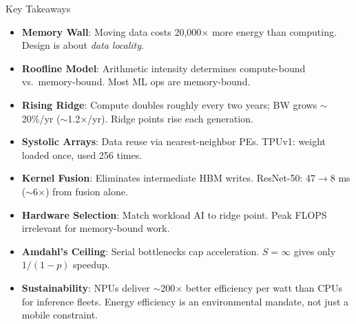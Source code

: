 \documentclass[aspectratio=169, 12pt]{beamer}
\begin{document}
\begin{frame}{Key Takeaways}

\scriptsize
\begin{itemize}\setlength\itemsep{0pt}
  \item \textbf{Memory Wall}: Moving data costs 20,000$\times$ more energy than computing. Design is about \emph{data locality}.
  \item \textbf{Roofline Model}: Arithmetic intensity determines compute-bound vs.\ memory-bound. Most ML ops are memory-bound.
  \item \textbf{Rising Ridge}: Compute doubles roughly every two years; BW grows $\sim$20\%/yr ($\sim$1.2$\times$/yr). Ridge points rise each generation.
  \item \textbf{Systolic Arrays}: Data reuse via nearest-neighbor PEs. TPUv1: weight loaded once, used 256 times.
  \item \textbf{Kernel Fusion}: Eliminates intermediate HBM writes. ResNet-50: 47$\to$8 ms ($\sim$6$\times$) from fusion alone.
  \item \textbf{Hardware Selection}: Match workload AI to ridge point. Peak FLOPS irrelevant for memory-bound work.
  \item \textbf{Amdahl's Ceiling}: Serial bottlenecks cap acceleration. $S\!=\!\infty$ gives only $1/(1\!-\!p)$ speedup.
  \item \textbf{Sustainability}: NPUs deliver $\sim$200$\times$ better efficiency per watt than CPUs for inference fleets. Energy efficiency is an environmental mandate, not just a mobile constraint.
\end{itemize}

\end{frame}
\end{document}
